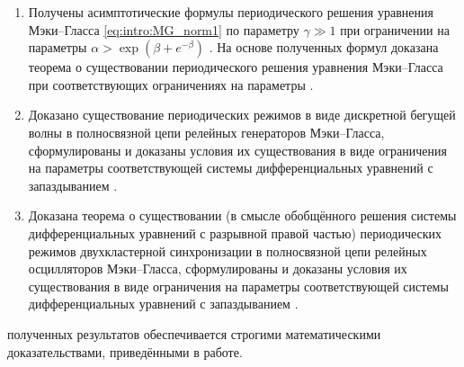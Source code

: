 {}
\begin{enumerate}[beginpenalty=10000] %
	\item Получены асимптотические формулы периодического решения уравнения Мэки--Гласса \eqref{eq:intro:MG_norm1} по параметру $\gamma \gg 1$ при ограничении на параметры $\alpha > \exp(\beta + e^{-\beta})$ \cite[Теорема 5.6]{wosbib1}. На основе полученных формул доказана теорема о существовании периодического решения уравнения Мэки--Гласса при соответствующих ограничениях на параметры \cite[Теорема 3.2]{wosbib1}.
	\item Доказано существование периодических режимов в виде дискретной бегущей волны в полносвязной цепи релейных генераторов Мэки--Гласса, сформулированы и доказаны условия их существования в виде ограничения на параметры соответствующей системы дифференциальных уравнений с запаздыванием \cite[Теорема 16]{wosbib2}.
	\item Доказана теорема о существовании (в смысле обобщённого решения системы дифференциальных уравнений с разрывной правой частью) периодических режимов двухкластерной синхронизации в полносвязной цепи релейных осцилляторов Мэки--Гласса, сформулированы и доказаны условия их существования в виде ограничения на параметры соответствующей системы дифференциальных уравнений с запаздыванием \cite[Теорема 5.2]{scbib1}.
\end{enumerate}


\bigskip

{\reliability} полученных результатов обеспечивается строгими математическими доказательствами, приведёнными в работе. %

\nocite{scbib1, wosbib1, wosbib2}

\bigskip

